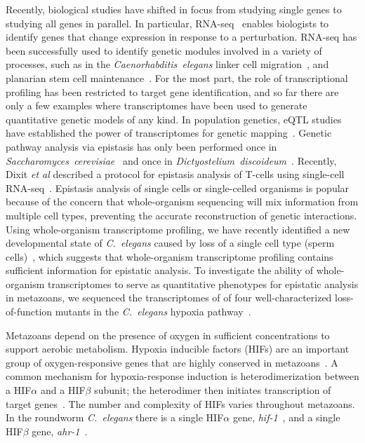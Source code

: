 \documentclass[9pt,twocolumn,twoside]{pnas-new}
\newcommand{\cel}{\emph{C.~elegans}}
\newcommand{\gene}[1]{\mbox{\emph{#1}}}
\begin{document}
Recently, biological studies have shifted in focus from studying single
genes to studying all genes in parallel. In particular,
RNA-seq~\cite{Mortazavi2008} enables biologists to
identify genes that change expression in response to a perturbation.
RNA-seq has been successfully used to identify genetic modules involved in a
variety of processes, such as in the \emph{Caenorhabditis~elegans} linker cell
migration~\cite{Schwarz2012}, and planarian stem cell
maintenance~\cite{VanWolfswinkel2014,Scimone2014}. For the most part, the role
of transcriptional profiling has been restricted to target gene identification,
and so far there are only a few examples where transcriptomes have been used to
generate quantitative genetic models of any kind. In population genetics, eQTL
studies have established the power of transcriptomes for genetic
mapping~\cite{Brem2002,Schadt2003,Li2006,King2014}. Genetic pathway analysis via
epistasis has only been performed once in
\emph{Saccharomyces~cerevisiae}~\cite{Hughes2000} and once in
\emph{Dictyostelium~discoideum}~\cite{VanDriessche2005}. Recently, Dixit
\emph{et al} described a protocol for epistasis analysis of T-cells using
single-cell RNA-seq~\cite{Dixit2016}. Epistasis analysis of single cells or
single-celled organisms is popular because of the concern that whole-organism
sequencing will mix information from multiple cell types, preventing the
accurate reconstruction of genetic interactions. Using whole-organism
transcriptome profiling, we have recently identified a new developmental state
of \cel{} caused by loss of a single cell type (sperm
cells)~\cite{Angeles-Albores2016a}, which suggests that whole-organism
transcriptome profiling contains sufficient information for epistatic analysis.
To investigate the ability of whole-organism transcriptomes to serve as
quantitative phenotypes for epistatic analysis in metazoans, we sequenced the
transcriptomes of of four well-characterized loss-of-function mutants in the
\cel{} hypoxia pathway~\cite{Epstein2001,Shen2006,Shao2009,Jiang2001}.

Metazoans depend on the presence of oxygen in sufficient concentrations to
support aerobic metabolism. Hypoxia inducible factors (HIFs) are an
important group of oxygen-responsive genes that are highly conserved in
metazoans~\cite{Loenarz2011}. A common mechanism for hypoxia-response induction
is heterodimerization between a HIF$\alpha$ and a HIF$\beta$ subunit; the
heterodimer then initiates transcription of target genes~\cite{Jiang1996}. The
number and complexity of HIFs varies throughout metazoans. In the roundworm
\cel{} there is a single HIF$\alpha$ gene, \gene{hif-1}~\cite{Jiang2001}, and a
single HIF$\beta$ gene, \gene{ahr-1}~\cite{Powell-Coffman1998}.
\end{document}
